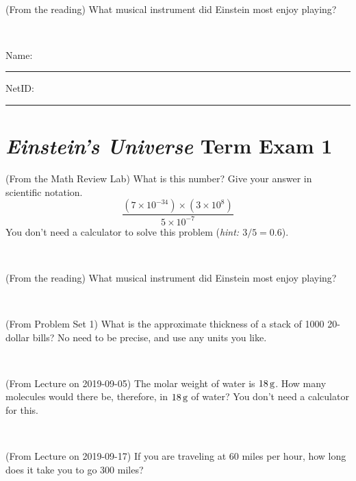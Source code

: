 \documentclass[12pt, letterpaper]{article}
\begin{document}
\vfill ~

\begin{problem} (From the reading)
What musical instrument did Einstein most enjoy playing?
\end{problem}


\vfill ~


\cleardoublepage



\noindent
Name: \rule[-1ex]{0.60\textwidth}{0.1pt}
NetID: \rule[-1ex]{0.20\textwidth}{0.1pt}

\section*{\textsl{Einstein's Universe} Term Exam 1}
\setcounter{problem}{1}


\begin{problem} (From the Math Review Lab)
What is this number? Give your answer in scientific notation.
$$
\frac{(7\times10^{-34})\times(3\times10^8)}{5\times10^{-7}}
$$
You don't need a calculator to solve this problem (\textit{hint: $3/5=0.6$}).
\end{problem}


\vfill ~

\begin{problem} (From the reading)
What musical instrument did Einstein most enjoy playing?
\end{problem}


\vfill ~

\begin{problem} (From Problem Set 1)
What is the approximate thickness of a stack of 1000 20-dollar bills?
No need to be precise, and use any units you like.
\end{problem}


\vfill ~

\begin{problem} (From Lecture on 2019-09-05)
The molar weight of water is $18\,\mathrm{g}$. How many molecules would there
be, therefore, in $18\,\mathrm{g}$ of water? You don't need a calculator for
this.
\end{problem}


\vfill ~


\clearpage


\begin{problem} (From Lecture on 2019-09-17)
If you are traveling at 60 miles per hour, how long does
it take you to go 300 miles?
\end{problem}


\vfill ~
\end{document}
